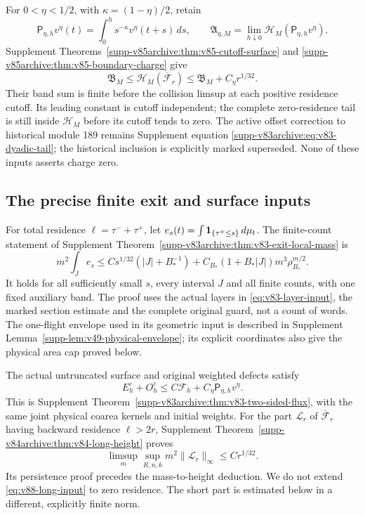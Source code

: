\documentclass[11pt,reqno]{amsart}
\numberwithin{equation}{section}
\theoremstyle{definition}\newtheorem{definition}[theorem]{Definition}
\theoremstyle{remark}\newtheorem{remark}[theorem]{Remark}
\theoremstyle{definition}\newtheorem{inputstatement}[theorem]{Input statement}
\begin{document}
For $0<\eta<1/2$, with $\kappa=(1-\eta)/2$, retain
\[
 \mathsf P_{\eta,h}v^\eta(t)=\int_0^h s^{-\kappa}v^\eta(t+s)\,ds,
 \qquad\mathfrak A_{\eta,M}
       =\lim_{h\downarrow0}\mathcal H_M(\mathsf P_{\eta,h}v^\eta).
\]
Supplement Theorems~\ref{supp-v85archive:thm:v85-cutoff-surface}
and \ref{supp-v85archive:thm:v85-boundary-charge} give
\begin{equation}\label{eq:v86-surface-input}
 \mathfrak B_M\le\mathcal H_M(\overline{\mathcal F}_r)
                         \le\mathfrak B_M+C_\eta r^{1/32}.
\end{equation}
Their band sum is finite before the collision limsup at each positive
residence cutoff. Its leading constant is cutoff independent; the
complete zero-residence tail is still inside $\mathcal H_M$ before
its cutoff tends to zero. The active offset correction to historical
module 189 remains Supplement equation
\eqref{supp-v83archive:eq:v83-dyadic-tail}; the historical inclusion is
explicitly marked superseded. None of these inputs asserts charge zero.


\subsection{The precise finite exit and surface inputs}
For total residence $\ell=\tau^-+\tau^+$, let
$e_s(t)=\int\mathbf1_{\{\tau^+\le s\}}\,d\mu_t$.
The finite-count statement of Supplement
Theorem~\ref{supp-v83archive:thm:v83-exit-local-mass} is
\begin{equation}\label{eq:v88-exit-input}
 m^2\int_J e_s\le C s^{1/32}(|J|+B_*^{-1})
       +C_{B_*}(1+B_*|J|)m^3\rho_{B_*}^{m/2}.
\end{equation}
It holds for all sufficiently small $s$, every interval $J$ and all
finite counts, with one fixed auxiliary band. The proof uses the
actual layers in \eqref{eq:v83-layer-input}, the marked section
estimate and the complete original guard, not a count of words.
The one-flight envelope used in its geometric input is described in
Supplement Lemma~\ref{supp-lem:v49-physical-envelope}; its explicit
coordinates also give the physical area cap proved below.

The actual untruncated surface and original weighted defects satisfy
\begin{equation}\label{eq:v88-optical-input}
 E_h^\varepsilon+O_h^\varepsilon
     \le C\mathcal F_h+C_\eta\mathsf P_{\eta,h}v^\eta.
\end{equation}
This is Supplement Theorem~\ref{supp-v83archive:thm:v83-two-sided-flux},
with the same joint physical coarea kernels and initial weights.
For the part $\mathcal L_r$ of $\overline{\mathcal F}_r$ having
backward residence $\ell>2r$, Supplement
Theorem~\ref{supp-v84archive:thm:v84-long-height} proves
\begin{equation}\label{eq:v88-long-input}
 \limsup_m\sup_{R,n,k}m^2\|\mathcal L_r\|_\infty\le Cr^{1/32}.
\end{equation}
Its persistence proof precedes the mass-to-height deduction. We do
not extend \eqref{eq:v88-long-input} to zero residence. The short
part is estimated below in a different, explicitly finite norm.
\end{document}

